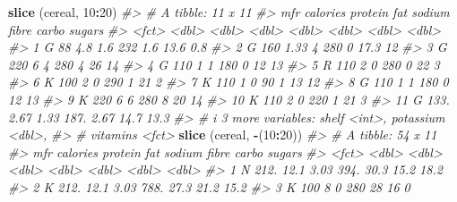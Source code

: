 \documentclass[
]{book}
\newenvironment{Shaded}{\begin{snugshade}}{\end{snugshade}}
\newcommand{\CommentTok}[1]{\textcolor[rgb]{0.56,0.35,0.01}{\textit{#1}}}
\newcommand{\DecValTok}[1]{\textcolor[rgb]{0.00,0.00,0.81}{#1}}
\newcommand{\FunctionTok}[1]{\textcolor[rgb]{0.13,0.29,0.53}{\textbf{#1}}}
\newcommand{\NormalTok}[1]{#1}
\newcommand{\SpecialCharTok}[1]{\textcolor[rgb]{0.81,0.36,0.00}{\textbf{#1}}}
\begin{document}
\begin{Shaded}
\begin{Highlighting}[]
\FunctionTok{slice}\NormalTok{ (cereal, }\DecValTok{10}\SpecialCharTok{:}\DecValTok{20}\NormalTok{)}
\CommentTok{\#\textgreater{} \# A tibble: 11 x 11}
\CommentTok{\#\textgreater{}    mfr   calories protein   fat sodium fibre carbo sugars}
\CommentTok{\#\textgreater{}    \textless{}fct\textgreater{}    \textless{}dbl\textgreater{}   \textless{}dbl\textgreater{} \textless{}dbl\textgreater{}  \textless{}dbl\textgreater{} \textless{}dbl\textgreater{} \textless{}dbl\textgreater{}  \textless{}dbl\textgreater{}}
\CommentTok{\#\textgreater{}  1 G          88     4.8   1.6    232   1.6   13.6    0.8}
\CommentTok{\#\textgreater{}  2 G         160     1.33  4      280   0     17.3   12  }
\CommentTok{\#\textgreater{}  3 G         220     6     4      280   4     26     14  }
\CommentTok{\#\textgreater{}  4 G         110     1     1      180   0     12     13  }
\CommentTok{\#\textgreater{}  5 R         110     2     0      280   0     22      3  }
\CommentTok{\#\textgreater{}  6 K         100     2     0      290   1     21      2  }
\CommentTok{\#\textgreater{}  7 K         110     1     0       90   1     13     12  }
\CommentTok{\#\textgreater{}  8 G         110     1     1      180   0     12     13  }
\CommentTok{\#\textgreater{}  9 K         220     6     6      280   8     20     14  }
\CommentTok{\#\textgreater{} 10 K         110     2     0      220   1     21      3  }
\CommentTok{\#\textgreater{} 11 G         133.    2.67  1.33   187.  2.67  14.7   13.3}
\CommentTok{\#\textgreater{} \# i 3 more variables: shelf \textless{}int\textgreater{}, potassium \textless{}dbl\textgreater{},}
\CommentTok{\#\textgreater{} \#   vitamins \textless{}fct\textgreater{}}
\FunctionTok{slice}\NormalTok{ (cereal, }\SpecialCharTok{{-}}\NormalTok{(}\DecValTok{10}\SpecialCharTok{:}\DecValTok{20}\NormalTok{))}
\CommentTok{\#\textgreater{} \# A tibble: 54 x 11}
\CommentTok{\#\textgreater{}    mfr   calories protein   fat sodium fibre carbo sugars}
\CommentTok{\#\textgreater{}    \textless{}fct\textgreater{}    \textless{}dbl\textgreater{}   \textless{}dbl\textgreater{} \textless{}dbl\textgreater{}  \textless{}dbl\textgreater{} \textless{}dbl\textgreater{} \textless{}dbl\textgreater{}  \textless{}dbl\textgreater{}}
\CommentTok{\#\textgreater{}  1 N         212.   12.1   3.03   394. 30.3   15.2  18.2 }
\CommentTok{\#\textgreater{}  2 K         212.   12.1   3.03   788. 27.3   21.2  15.2 }
\CommentTok{\#\textgreater{}  3 K         100     8     0      280  28     16     0   }

\end{Highlighting}
\end{Shaded}
\end{document}
